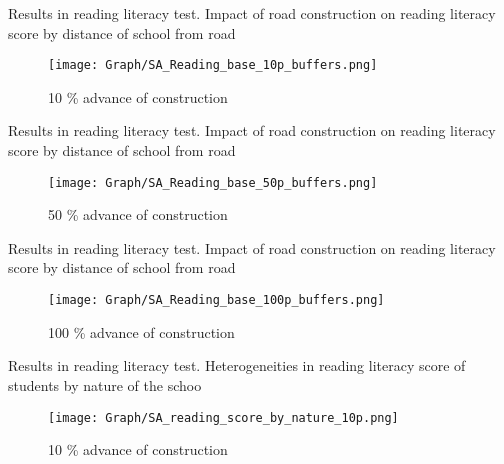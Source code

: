 \documentclass[9pt]{beamer}
\begin{document}
\begin{frame}{ Results in reading literacy test.  \hyperlink{result_read_}{} }\label{10p_read_buf}
\small Impact of road construction on reading literacy score by distance of school from road 
\begin{figure}
  \centering
  \texttt{[image: Graph/SA\_Reading\_base\_10p\_buffers.png]} 
  \caption{\small 10 \% advance of construction}
  \label{fig:6.1sub-first}
\end{figure}

\end{frame}
\begin{frame}{ Results in reading literacy test.  \hyperlink{result_read_}{} }\label{50p_read_buf}
\small Impact of road construction on reading literacy score by distance of school from road 
\begin{figure}
  \centering
  \texttt{[image: Graph/SA\_Reading\_base\_50p\_buffers.png]} 
  \caption{\small 50 \% advance of construction}
  \label{fig:6.1sub-first}
\end{figure}

\end{frame}
\begin{frame}{ Results in reading literacy test.   \hyperlink{result_read_}{} }\label{100p_read_buf}
\small Impact of road construction on reading literacy score by distance of school from road 
\begin{figure}
  \centering
  \texttt{[image: Graph/SA\_Reading\_base\_100p\_buffers.png]} 
  \caption{\small 100 \% advance of construction}
 
\end{figure}

\end{frame}



\begin{frame}{ Results in reading literacy test.  \hyperlink{result_read_}{} }\label{10p_read_nat}
\small Heterogeneities in reading literacy score of students by nature of the schoo
\begin{figure}
  \centering
  \texttt{[image: Graph/SA\_reading\_score\_by\_nature\_10p.png]} 
  \caption{\small 10 \% advance of construction}
  \label{fig:6.1sub-first}
\end{figure}

\end{frame}
\end{document}
